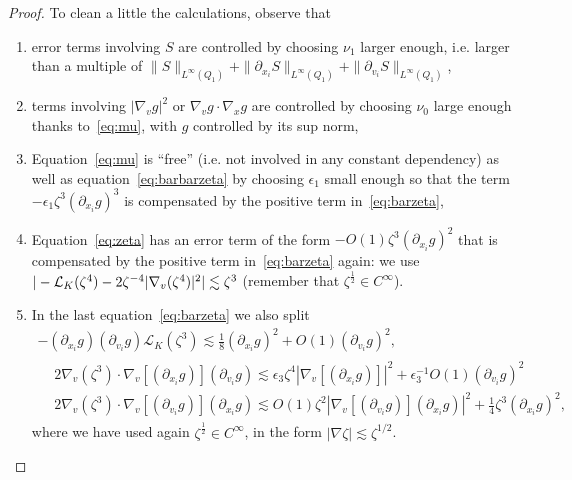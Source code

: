 \documentclass[10pt]{amsart}
\theoremstyle{definition}\newtheorem{defi}[theo]{Definition}\newtheorem{rema}[theo]{Remark}\newtheorem{exam}[theo]{Example}\newtheorem{exem}[theo]{Example}\newtheorem{nota}[theo]{Notation}
\newcommand{\cL}{\mathcal{L}}
\begin{document}
\begin{proof}
To clean a little the calculations, observe that
\begin{enumerate}
\item \label{proofprop3.1.1}error terms involving $S$ are controlled by choosing $\nu_1$ larger enough, i.e. larger than a multiple of $\|S\|_{L^\infty(Q_1)} +\|\partial_{x_i} S\|_{L^\infty(Q_1)}+\|\partial_{v_i} S\|_{L^\infty(Q_1)}$,
\item \label{proofprop3.1.2}terms involving $|\nabla_v g|^2$ or $\nabla_v g \cdot \nabla_x g$ are controlled by choosing $\nu_0$ large enough thanks to~\eqref{eq:mu}, with $g$ controlled by its sup norm,
\item \label{proofprop3.1.3}Equation~\eqref{eq:mu} is ``free'' (i.e. not involved in any constant dependency) as well as equation~\eqref{eq:barbarzeta} by choosing $\epsilon_1$ small enough so that the term $-\epsilon_1 \zeta^3 (\partial_{x_i} g)^3$ is compensated by the positive term in~\eqref{eq:barzeta},
\item \label{proofprop3.1.4}Equation~\eqref{eq:zeta} has an error term of the form $-O(1) \zeta^3 (\partial_{x_i} g)^2$ that is compensated by the positive term in~\eqref{eq:barzeta} again: we use $|- \cL_K (\zeta^4) - 2 \zeta^{-4} |\nabla_v (\zeta^4)|^2 |\linebreak
\lesssim \zeta^3$ (remember that $\zeta^{\frac12} \in C^\infty$).
\item \label{proofprop3.1.5}In the last equation~\eqref{eq:barzeta} we also split
\begin{multline*}
- (\partial_{x_i}g)(\partial_{v_i} g) \cL_K (\zeta^3)
\lesssim \frac18 (\partial_{x_i} g)^2 + O(1) (\partial_{v_i} g)^2,\\
\begin{aligned}
& 2 \nabla_v (\zeta^3) \cdot \nabla_v [(\partial_{x_i} g)] (\partial_{v_i}g) \lesssim \epsilon_3 \zeta^4 |\nabla_v [(
\partial_{x_i} g)]|^2 + \epsilon_3 ^{-1} O(1) (\partial_{v_i}g) ^2 \\
& 2 \nabla_v (\zeta^3) \cdot \nabla_v [(\partial_{v_i}g)] (
\partial_{x_i} g) \lesssim O(1) \zeta^2 |\nabla_v [(\partial_{v_i}g)] (\partial_{x_i} g)|^2 + \frac{1}{4}
\zeta^3(\partial_{x_i} g)^2,
\end{aligned}
\end{multline*}
where we have used again $\zeta^{\frac12} \in C^\infty$, in the form $|\nabla \zeta| \lesssim \zeta^{1/2}$.
\end{enumerate}


\end{proof}
\end{document}
